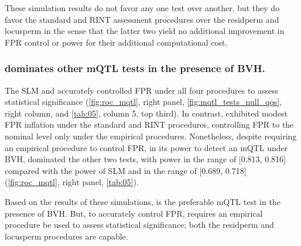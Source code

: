 These simulation results do not favor any one test over another, but they do favor the standard and RINT assessment procedures over the residperm and locusperm in the sense that the latter two yield no additional improvement in FPR control or power for their additional computational cost.

\subsubsection{\DGLMm dominates other mQTL tests in the presence of BVH.}

The SLM and \Caom accurately controlled FPR under all four procedures to assess statistical significance (\autoref{fig:roc_mqtl}, right panel, \autoref{fig:mqtl_tests_null_qqs}, right column, and \autoref{tab:05}, column 5, top third).
In contrast, \DGLMm exhibited modest FPR inflation under the standard and RINT procedures, controlling FPR to the nominal level only under the empirical procedures.
Nonetheless, despite requiring an empirical procedure to control FPR, in its power to detect an mQTL under BVH, \DGLMm dominated the other two tests, with power in the range of [0.813, 0.816] compared with the power of SLM and \Caom in the range of [0.689, 0.718] (\autoref{fig:roc_mqtl}, right panel, \autoref{tab:05}).

Based on the results of these simulations, \DGLMm is the preferable mQTL test in the presence of BVH.
But, to accurately control FPR, \DGLMm requires an empirical procedure be used to assess statistical significance; both the residperm and locusperm procedures are capable.







